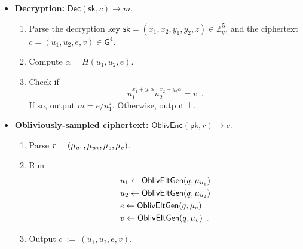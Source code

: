 \documentclass[11pt,letterpaper]{article}
\theoremstyle{plain} %
\theoremstyle{definition} %
\theoremstyle{remark} %
\newcommand{\eqdef}{\ {:=} \ }
\newcommand{\OblivEnc}{\mathsf{OblivEnc}}
\newcommand{\Dec}{\mathsf{Dec}}
\newcommand{\EncKey}{\mathsf{pk}}
\newcommand{\DecKey}{\mathsf{sk}}
\newcommand{\Msg}{m}
\newcommand{\Ciphertext}{c}
\newcommand{\Rand}{r}
\newcommand{\Integers}{\mathbb{Z}}
\newcommand{\Group}{\mathsf{G}}
\newcommand{\GrpOrd}{q}
\newcommand{\GrpEltE}{e}
\newcommand{\GrpEltU}{u}
\newcommand{\GrpEltV}{v}
\newcommand{\Hash}{H}
\newcommand{\ExpX}{x}
\newcommand{\ExpY}{y}
\newcommand{\ExpZ}{z}
\newcommand{\Tag}{\alpha}
\begin{document}
\begin{itemize}[nolistsep]
    \item \textbf{Decryption:} $\Dec(\DecKey, \Ciphertext) \to \Msg$.
    \begin{enumerate}[nolistsep]
        \item Parse the decryption key $\DecKey = (\ExpX_1, \ExpX_2, \ExpY_1, \ExpY_2, \ExpZ) \in \Integers_{\GrpOrd}^5$, and the ciphertext $\Ciphertext = (\GrpEltU_1, \GrpEltU_2, \GrpEltE, \GrpEltV) \in \Group^4$.
        \item Compute $\Tag = \Hash(\GrpEltU_1, \GrpEltU_2, \GrpEltE)$.
        \item Check if
        \begin{equation*}
            \GrpEltU_1^{\ExpX_1 + \ExpY_1 \Tag} \GrpEltU_2^{\ExpX_2 + \ExpY_2 \Tag}
            = \GrpEltV
            \enspace.
        \end{equation*} If so, output $\Msg = \GrpEltE / \GrpEltU_1^{\ExpZ}$. Otherwise, output $\bot$.
    \end{enumerate}

    \item \textbf{Obliviously-sampled ciphertext:} $\OblivEnc(\EncKey, \Rand) \to \Ciphertext$.
    \begin{enumerate}[nolistsep]
        \item Parse $\Rand = (\RandStr_{\GrpEltU_1}, \RandStr_{\GrpEltU_2}, \RandStr_{\GrpEltE}, \RandStr_{\GrpEltV})$.
        \item Run
        \begin{align*}
            &\GrpEltU_1 \gets \OblivEltGen(\GrpOrd, \RandStr_{\GrpEltU_1})\\
            &\GrpEltU_2 \gets \OblivEltGen(\GrpOrd, \RandStr_{\GrpEltU_2})\\
            &\GrpEltE \gets \OblivEltGen(\GrpOrd, \RandStr_{\GrpEltE})\\
            &\GrpEltV \gets \OblivEltGen(\GrpOrd, \RandStr_{\GrpEltV})
            \enspace.
        \end{align*}
        \item Output $\Ciphertext \eqdef (\GrpEltU_1,\GrpEltU_2,\GrpEltE,\GrpEltV)$.
    \end{enumerate}


\end{itemize}
\end{document}
